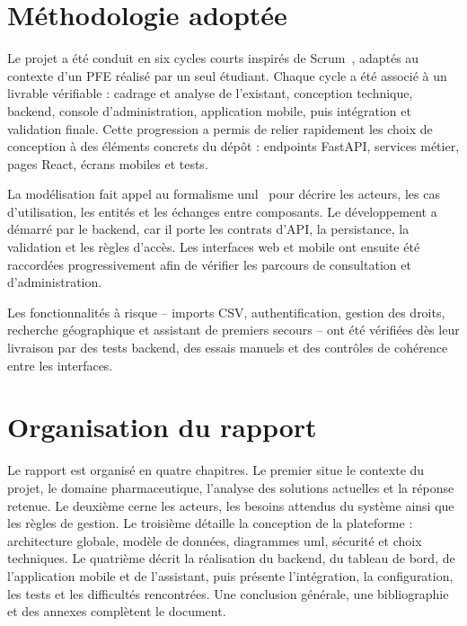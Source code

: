 \section*{Méthodologie adoptée}

Le projet a été conduit en six cycles courts inspirés de Scrum~\cite{scrumguide}, adaptés au contexte d'un
PFE réalisé par un seul étudiant. Chaque cycle a été associé à un livrable vérifiable : cadrage et analyse
de l'existant, conception technique, backend, console d'administration, application mobile, puis
intégration et validation finale. Cette progression a permis de relier rapidement les choix de conception à
des éléments concrets du dépôt : endpoints FastAPI, services métier, pages React, écrans mobiles et tests.

La modélisation fait appel au formalisme \gls{uml}~\cite{uml} pour décrire les acteurs, les cas
d'utilisation, les entités et les échanges entre composants. Le développement a démarré par le backend, car
il porte les contrats d'API, la persistance, la validation et les règles d'accès. Les interfaces web et
mobile ont ensuite été raccordées progressivement afin de vérifier les parcours de consultation et
d'administration.

Les fonctionnalités à risque -- imports CSV, authentification, gestion des droits, recherche
géographique et assistant de premiers secours -- ont été vérifiées dès leur livraison par des tests
backend, des essais manuels et des contrôles de cohérence entre les interfaces.

\section*{Organisation du rapport}

Le rapport est organisé en quatre chapitres. Le premier situe le contexte du projet, le domaine
pharmaceutique, l'analyse des solutions actuelles et la réponse retenue. Le deuxième cerne les acteurs, les
besoins attendus du système ainsi que les règles de gestion. Le troisième détaille la conception de la
plateforme : architecture globale, modèle de données, diagrammes \gls{uml}, sécurité et choix techniques.
Le quatrième décrit la réalisation du backend, du tableau de bord, de l'application mobile et de
l'assistant, puis présente l'intégration, la configuration, les tests et les difficultés rencontrées. Une
conclusion générale, une bibliographie et des annexes complètent le document.
